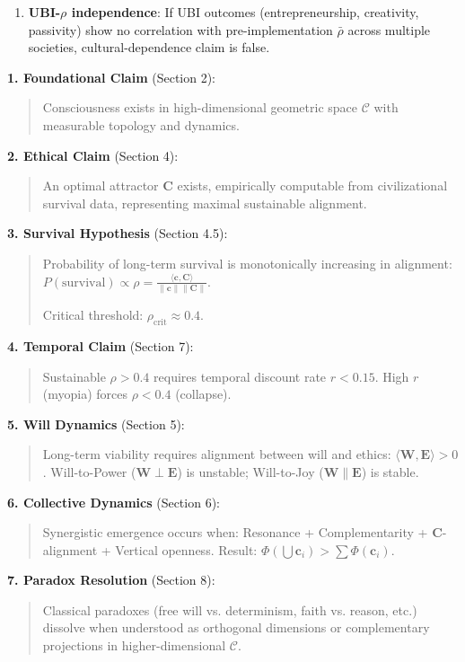 \documentclass[11pt,a4paper]{article}
\theoremstyle{definition}
\theoremstyle{remark}
\newcommand{\CC}{\mathcal{C}}
\newcommand{\EE}{\mathbf{E}}
\newcommand{\WW}{\mathbf{W}}
\newcommand{\cc}{\mathbf{c}}
\begin{document}
\begin{enumerate}
\begin{mdframed}[backgroundcolor=blue!5,linewidth=2pt]
\begin{enumerate}
    \item \textbf{UBI-\(\rho\) independence}: If UBI outcomes (entrepreneurship, creativity, passivity) show no correlation with pre-implementation \(\bar{\rho}\) across multiple societies, cultural-dependence claim is false.
\end{enumerate}


\textbf{1. Foundational Claim} (Section 2): 
\begin{quote}
Consciousness exists in high-dimensional geometric space \(\CC\) with measurable topology and dynamics.
\end{quote}

\textbf{2. Ethical Claim} (Section 4):
\begin{quote}
An optimal attractor \(\mathbf{C}\) exists, empirically computable from civilizational survival data, representing maximal sustainable alignment.
\end{quote}

\textbf{3. Survival Hypothesis} (Section 4.5):
\begin{quote}
Probability of long-term survival is monotonically increasing in alignment: \(P(\text{survival}) \propto \rho = \frac{\langle \cc, \mathbf{C} \rangle}{\|\cc\| \|\mathbf{C}\|}\).

Critical threshold: \(\rho_{\text{crit}} \approx 0.4\).
\end{quote}

\textbf{4. Temporal Claim} (Section 7):
\begin{quote}
Sustainable \(\rho > 0.4\) requires temporal discount rate \(r < 0.15\). High \(r\) (myopia) forces \(\rho < 0.4\) (collapse).
\end{quote}

\textbf{5. Will Dynamics} (Section 5):
\begin{quote}
Long-term viability requires alignment between will and ethics: \(\langle \WW, \EE \rangle > 0\). Will-to-Power (\(\WW \perp \EE\)) is unstable; Will-to-Joy (\(\WW \parallel \EE\)) is stable.
\end{quote}

\textbf{6. Collective Dynamics} (Section 6):
\begin{quote}
Synergistic emergence occurs when: Resonance + Complementarity + \(\mathbf{C}\)-alignment + Vertical openness. Result: \(\Phi(\bigcup \cc_i) > \sum \Phi(\cc_i)\).
\end{quote}

\textbf{7. Paradox Resolution} (Section 8):
\begin{quote}
Classical paradoxes (free will vs. determinism, faith vs. reason, etc.) dissolve when understood as orthogonal dimensions or complementary projections in higher-dimensional \(\CC\).
\end{quote}


\end{mdframed}
\end{enumerate}
\end{document}
